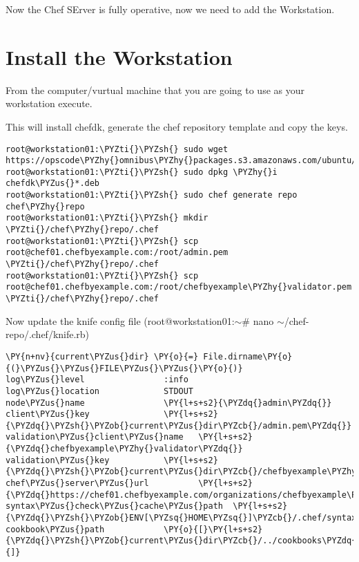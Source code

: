 
Now the Chef SErver is fully operative, now we need to add the Workstation.

\section{Install the Workstation}

From the computer/vurtual machine that you are going to use as your workstation execute.

This will install chefdk, generate the chef repository template and copy the keys.

\begin{codelisting}
\label{code:}
\codecaption{}
\begin{Verbatim}[fontsize=\relsize{-2.5},fontseries=b,commandchars=\\\{\}]
root@workstation01:\PYZti{}\PYZsh{} sudo wget https://opscode\PYZhy{}omnibus\PYZhy{}packages.s3.amazonaws.com/ubuntu/12.04/x86\PYZus{}64/chefdk\PYZus{}0.7.0\PYZhy{}1\PYZus{}amd64.deb
root@workstation01:\PYZti{}\PYZsh{} sudo dpkg \PYZhy{}i chefdk\PYZus{}*.deb
root@workstation01:\PYZti{}\PYZsh{} sudo chef generate repo chef\PYZhy{}repo
root@workstation01:\PYZti{}\PYZsh{} mkdir \PYZti{}/chef\PYZhy{}repo/.chef
root@workstation01:\PYZti{}\PYZsh{} scp root@chef01.chefbyexample.com:/root/admin.pem \PYZti{}/chef\PYZhy{}repo/.chef
root@workstation01:\PYZti{}\PYZsh{} scp root@chef01.chefbyexample.com:/root/chefbyexample\PYZhy{}validator.pem \PYZti{}/chef\PYZhy{}repo/.chef
\end{Verbatim}
\end{codelisting}

Now update the knife config file (root@workstation01:\ensuremath{\sim}\# nano \ensuremath{\sim}/chef-repo/.chef/knife.rb)

\begin{codelisting}
\label{code:}
\codecaption{}
\begin{Verbatim}[fontsize=\relsize{-2.5},fontseries=b,commandchars=\\\{\}]
\PY{n+nv}{current\PYZus{}dir} \PY{o}{=} File.dirname\PY{o}{(}\PYZus{}\PYZus{}FILE\PYZus{}\PYZus{}\PY{o}{)}
log\PYZus{}level                :info
log\PYZus{}location             STDOUT
node\PYZus{}name                \PY{l+s+s2}{\PYZdq{}admin\PYZdq{}}
client\PYZus{}key               \PY{l+s+s2}{\PYZdq{}\PYZsh{}\PYZob{}current\PYZus{}dir\PYZcb{}/admin.pem\PYZdq{}}
validation\PYZus{}client\PYZus{}name   \PY{l+s+s2}{\PYZdq{}chefbyexample\PYZhy{}validator\PYZdq{}}
validation\PYZus{}key           \PY{l+s+s2}{\PYZdq{}\PYZsh{}\PYZob{}current\PYZus{}dir\PYZcb{}/chefbyexample\PYZhy{}validator.pem\PYZdq{}}
chef\PYZus{}server\PYZus{}url          \PY{l+s+s2}{\PYZdq{}https://chef01.chefbyexample.com/organizations/chefbyexample\PYZdq{}}
syntax\PYZus{}check\PYZus{}cache\PYZus{}path  \PY{l+s+s2}{\PYZdq{}\PYZsh{}\PYZob{}ENV[\PYZsq{}HOME\PYZsq{}]\PYZcb{}/.chef/syntaxcache\PYZdq{}}
cookbook\PYZus{}path            \PY{o}{[}\PY{l+s+s2}{\PYZdq{}\PYZsh{}\PYZob{}current\PYZus{}dir\PYZcb{}/../cookbooks\PYZdq{}}\PY{o}{]}
\end{Verbatim}
\end{codelisting}

